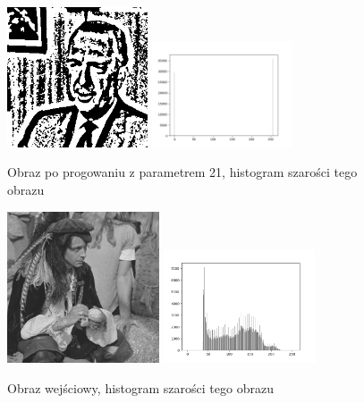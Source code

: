 \documentclass[final,a4paper,openany,12pt]{mwbk}
\begin{document}
\begin{figure}[H]
	\begin{center}
		\includegraphics[width=0.37\textwidth]{gentelman_gray_locThreshold_result}
		\includegraphics[width=0.37\textwidth]{gentelman_gray_locThreshold_histogram}
	\end{center}
	\caption{Obraz po progowaniu z parametrem 21, histogram szarości tego obrazu}
\end{figure}

\begin{figure}[H]
	\begin{center}
		\includegraphics[width=0.4\textwidth]{pirate_gray}
		\includegraphics[width=0.4\textwidth]{pirate_gray_histogram}
	\end{center}
	\caption{Obraz wejściowy, histogram szarości tego obrazu}
\end{figure}
\end{document}
